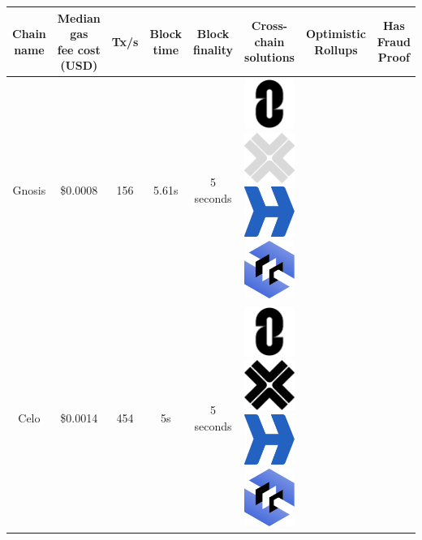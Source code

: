 \documentclass[fleqn,10pt]{olplainarticle}
\begin{document}
\begin{table}[H]
	\tiny
	\centering
	\begin{tabular}{|c|c|c|c|c|c|c|c|}
		\hline
		Chain name & \makecell{Median gas \\ fee cost (USD)}  & Tx/s & Block time & Block finality & \makecell{Cross-chain\\ solutions} & \makecell{Optimistic \\ Rollups} & Has Fraud Proof \\ \hline
		
		Gnosis & \cellcolor[RGB]{0,255,0}\$0.0008 & \cellcolor[RGB]{255,100,0}156 & \cellcolor[RGB]{255,50,0}5.61s  & \cellcolor[RGB]{130,255,10}5 seconds \cite{murdock_deep_2022}  & \includegraphics[width=0.03\linewidth]{img/logoLayerZero}
		\includegraphics[width=0.03\linewidth]{img/logoAxelarOPA} \includegraphics[width=0.03\linewidth]{img/logoHyperlane} \includegraphics[width=0.03\linewidth]{img/logoCCIP} & & \\ \hline
		
		Celo & \cellcolor[RGB]{130,255,10}\$0.0014 & \cellcolor[RGB]{200,255,0}454 & \cellcolor[RGB]{255,100,0}5s  & \cellcolor[RGB]{130,255,10}5 seconds \cite{marek_you_2020} & \includegraphics[width=0.03\linewidth]{img/logoLayerZero} \includegraphics[width=0.03\linewidth]{img/logoAxelar} \includegraphics[width=0.03\linewidth]{img/logoHyperlane} \includegraphics[width=0.03\linewidth]{img/logoCCIP} & & \\ \hline
		

\end{tabular}
\end{table}
\end{document}

